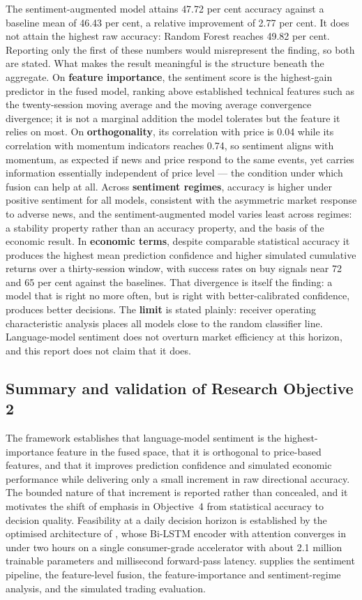 The sentiment-augmented model attains 47.72 per cent accuracy against a baseline mean of 46.43
per cent, a relative improvement of 2.77 per cent. It does not attain the highest raw accuracy:
Random Forest reaches 49.82 per cent. Reporting only the first of these numbers would
misrepresent the finding, so both are stated. What makes the result meaningful is the structure
beneath the aggregate. On \textbf{feature importance}, the sentiment score is the highest-gain
predictor in the fused model, ranking above established technical features such as the
twenty-session moving average and the moving average convergence divergence; it is not a
marginal addition the model tolerates but the feature it relies on most. On
\textbf{orthogonality}, its correlation with price is 0.04 while its correlation with momentum
indicators reaches 0.74, so sentiment aligns with momentum, as expected if news and price
respond to the same events, yet carries information essentially independent of price level ---
the condition under which fusion can help at all. Across \textbf{sentiment regimes}, accuracy is
higher under positive sentiment for all models, consistent with the asymmetric market response
to adverse news, and the sentiment-augmented model varies least across regimes: a stability
property rather than an accuracy property, and the basis of the economic result. In
\textbf{economic terms}, despite comparable statistical accuracy it produces the highest mean
prediction confidence and higher simulated cumulative returns over a thirty-session window, with
success rates on buy signals near 72 and 65 per cent against the baselines. That divergence is
itself the finding: a model that is right no more often, but is right with better-calibrated
confidence, produces better decisions. The \textbf{limit} is stated plainly: receiver operating
characteristic analysis places all models close to the random classifier line. Language-model
sentiment does not overturn market efficiency at this horizon, and this report does not claim
that it does.

\subsection{Summary and validation of Research Objective 2}

The framework establishes that language-model sentiment is the highest-importance feature in the
fused space, that it is orthogonal to price-based features, and that it improves prediction
confidence and simulated economic performance while delivering only a small increment in raw
directional accuracy. The bounded nature of that increment is reported rather than concealed,
and it motivates the shift of emphasis in Objective~4 from statistical accuracy to decision
quality. Feasibility at a daily decision horizon is established by the optimised architecture of
, whose Bi-LSTM encoder with attention converges in under two hours on a single
consumer-grade accelerator with about 2.1 million trainable parameters and millisecond
forward-pass latency.  supplies the sentiment pipeline, the feature-level fusion, the
feature-importance and sentiment-regime analysis, and the simulated trading evaluation.

